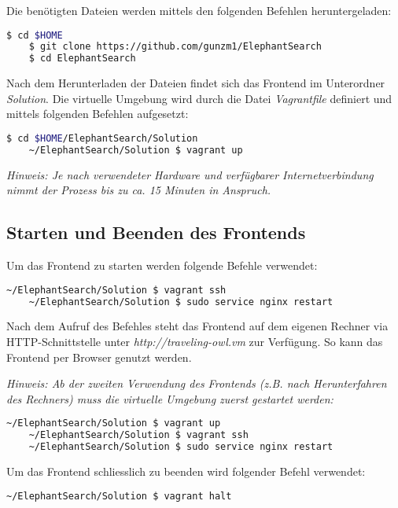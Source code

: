 Die benötigten Dateien werden mittels den folgenden Befehlen heruntergeladen:
\begin{lstlisting}[language=bash]
    $ cd $HOME
    $ git clone https://github.com/gunzm1/ElephantSearch
    $ cd ElephantSearch
\end{lstlisting}

Nach dem Herunterladen der Dateien findet sich das Frontend im Unterordner \textit{Solution}. Die virtuelle Umgebung wird durch die Datei \textit{Vagrantfile} definiert und mittels folgenden Befehlen aufgesetzt:
\begin{lstlisting}[language=bash]
                              $ cd $HOME/ElephantSearch/Solution
    ~/ElephantSearch/Solution $ vagrant up
\end{lstlisting}
\textit{Hinweis: Je nach verwendeter Hardware und verfügbarer Internetverbindung nimmt der Prozess bis zu ca. 15 Minuten in Anspruch.}

\subsection{Starten und Beenden des Frontends}
\label{chap:anh:ihb:frontend:start}
Um das Frontend zu starten werden folgende Befehle verwendet:
\begin{lstlisting}[language=bash]
    ~/ElephantSearch/Solution $ vagrant ssh
    ~/ElephantSearch/Solution $ sudo service nginx restart
\end{lstlisting}
Nach dem Aufruf des Befehles steht das Frontend auf dem eigenen Rechner via HTTP-Schnittstelle unter \textit{http://traveling-owl.vm} zur Verfügung. So kann das Frontend per Browser genutzt werden.

\textit{Hinweis: Ab der zweiten Verwendung des Frontends (z.B. nach Herunterfahren des Rechners) muss die virtuelle Umgebung zuerst gestartet werden:}
\begin{lstlisting}[language=bash]
    ~/ElephantSearch/Solution $ vagrant up
    ~/ElephantSearch/Solution $ vagrant ssh
    ~/ElephantSearch/Solution $ sudo service nginx restart
\end{lstlisting}

Um das Frontend schliesslich zu beenden wird folgender Befehl verwendet:
\begin{lstlisting}[language=bash]
    ~/ElephantSearch/Solution $ vagrant halt
\end{lstlisting}
